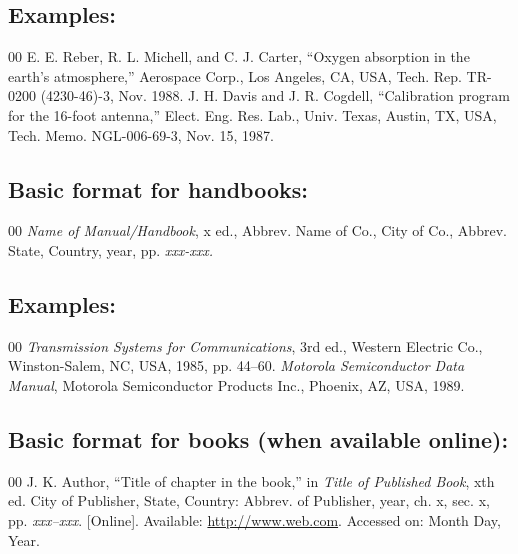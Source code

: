 \documentclass{IEEEtran}
\begin{document}
\subsection*{Examples:}

\begin{thebibliography}{00}
 E. E. Reber, R. L. Michell, and C. J. Carter, ``Oxygen absorption in the earth's atmosphere,'' Aerospace Corp., Los Angeles, CA, USA, Tech. Rep. TR-0200 (4230-46)-3, Nov. 1988.
 J. H. Davis and J. R. Cogdell, ``Calibration program for the 16-foot antenna,'' Elect. Eng. Res. Lab., Univ. Texas, Austin, TX, USA, Tech. Memo. NGL-006-69-3, Nov. 15, 1987.
\end{thebibliography}

\subsection*{Basic format for handbooks:}

\begin{thebibliography}{00}
 \textit{Name of Manual/Handbook}, x ed., Abbrev. Name of Co., City of Co., Abbrev. State, Country, year, pp.
\textit{xxx-xxx.}
\end{thebibliography}

\subsection*{Examples:}

\begin{thebibliography}{00}
 \textit{Transmission Systems for Communications}, 3rd ed., Western Electric Co., Winston-Salem, NC, USA, 1985, pp. 44--60.
 \textit{Motorola Semiconductor Data Manual}, Motorola Semiconductor Products Inc., Phoenix, AZ, USA, 1989.
\end{thebibliography}

\subsection*{Basic format for books (when available online): }

\begin{thebibliography}{00}
 J. K. Author, ``Title of chapter in the book,'' in \textit{Title of Published Book}, xth ed. City of
Publisher, State, Country: Abbrev. of Publisher, year, ch. x, sec. x, pp.
\textit{xxx--xxx}. [Online]. Available: \underline {http://www.web.com}. Accessed on: Month
Day, Year.
\end{thebibliography}
\end{document}
